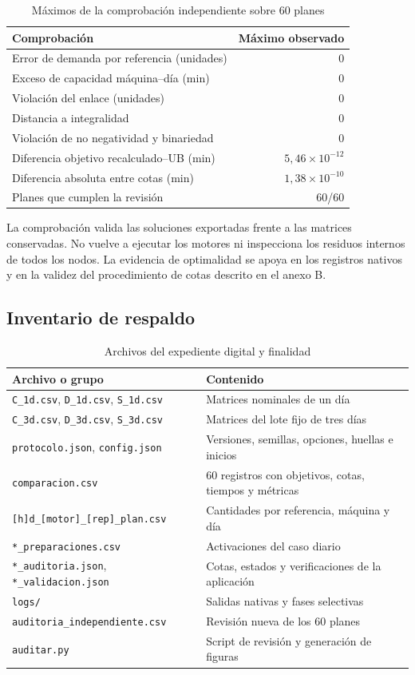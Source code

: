 \documentclass[12pt,a4paper,oneside]{article}
\begin{document}
\begin{table}[H]\centering\small
\caption{Máximos de la comprobación independiente sobre 60 planes}
\begin{tabular}{lr}\toprule
Comprobación & Máximo observado\\\midrule
Error de demanda por referencia (unidades)&0\\
Exceso de capacidad máquina--día (min)&0\\
Violación del enlace (unidades)&0\\
Distancia a integralidad&0\\
Violación de no negatividad y binariedad&0\\
Diferencia objetivo recalculado--UB (min)&$5,46\times10^{-12}$\\
Diferencia absoluta entre cotas (min)&$1,38\times10^{-10}$\\
Planes que cumplen la revisión&60/60\\\bottomrule
\end{tabular}
\end{table}
La comprobación valida las soluciones exportadas frente a las matrices conservadas. No vuelve a ejecutar los motores ni inspecciona los residuos internos de todos los nodos. La evidencia de optimalidad se apoya en los registros nativos y en la validez del procedimiento de cotas descrito en el anexo B.

\subsection{Inventario de respaldo}
\begin{table}[H]\centering\small
\caption{Archivos del expediente digital y finalidad}
\begin{tabular}{p{66mm}p{83mm}}\toprule
Archivo o grupo&Contenido\\\midrule
\texttt{C\_1d.csv}, \texttt{D\_1d.csv}, \texttt{S\_1d.csv}&Matrices nominales de un día\\
\texttt{C\_3d.csv}, \texttt{D\_3d.csv}, \texttt{S\_3d.csv}&Matrices del lote fijo de tres días\\
\texttt{protocolo.json}, \texttt{config.json}&Versiones, semillas, opciones, huellas e inicios\\
\texttt{comparacion.csv}&60 registros con objetivos, cotas, tiempos y métricas\\
\texttt{[h]d\_[motor]\_[rep]\_plan.csv}&Cantidades por referencia, máquina y día\\
\texttt{*\_preparaciones.csv}&Activaciones del caso diario\\
\texttt{*\_auditoria.json}, \texttt{*\_validacion.json}&Cotas, estados y verificaciones de la aplicación\\
\texttt{logs/}&Salidas nativas y fases selectivas\\
\texttt{auditoria\_independiente.csv}&Revisión nueva de los 60 planes\\
\texttt{auditar.py}&Script de revisión y generación de figuras\\\bottomrule
\end{tabular}
\end{table}
\end{document}
